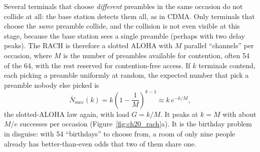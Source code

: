 Several terminals that choose \emph{different} preambles in the same occasion do not collide at all: the base
station detects them all, as in CDMA. Only terminals that choose the \emph{same} preamble collide, and the
collision is not even visible at this stage, because the base station sees a single preamble (perhaps with two
delay peaks). The RACH is therefore a slotted ALOHA with $M$ parallel ``channels'' per occasion, where $M$ is
the number of preambles available for contention, often 54 of the 64, with the rest reserved for
contention-free access. If $k$ terminals contend, each picking a preamble uniformly at random, the expected
number that pick a preamble nobody else picked is
\begin{equation}
\bar N_{\text{succ}}(k)=k\left(1-\frac1M\right)^{k-1}\approx k\,e^{-k/M},
\label{eq:ch20:rach}
\end{equation}
the slotted-ALOHA law again, with load $G=k/M$. It peaks at $k=M$ with about $M/e$ successes per occasion
(Figure~\ref{fig:ch20_rach}a). It is the birthday problem in disguise: with 54 ``birthdays'' to choose from,
a room of only nine people already has better-than-even odds that two of them share one.

